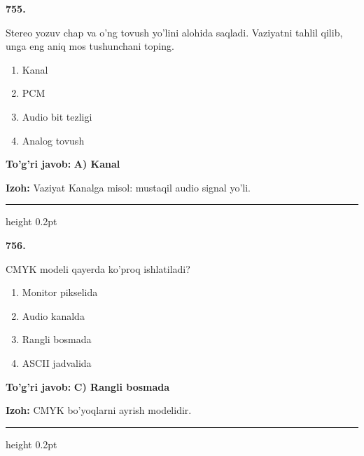 \documentclass[10pt,a4paper,oneside]{article}
\begin{document}
\noindent\textbf{\color{ink}755.}
\par
Stereo yozuv chap va o'ng tovush yo'lini alohida saqladi. Vaziyatni tahlil qilib, unga eng aniq mos tushunchani toping.
\begin{enumerate}[label=\Alph*),leftmargin=9mm]
\item Kanal
\item PCM
\item Audio bit tezligi
\item Analog tovush
\end{enumerate}
\begin{tcolorbox}[enhanced,breakable,colback=teal!4,colframe=teal!50!black,boxrule=0.5pt,arc=1.1mm,left=3mm,right=3mm,top=1.7mm,bottom=1.7mm,before skip=2mm,after skip=2mm]
\textbf{\color{teal}To'g'ri javob:} \textbf{A) Kanal}
\par\smallskip
\textbf{Izoh:} Vaziyat Kanalga misol: mustaqil audio signal yo'li.
\end{tcolorbox}
\vspace{2mm}\hrule height 0.2pt \vspace{3mm}

\noindent\textbf{\color{ink}756.}
\par
CMYK modeli qayerda ko'proq ishlatiladi?
\begin{enumerate}[label=\Alph*),leftmargin=9mm]
\item Monitor pikselida
\item Audio kanalda
\item Rangli bosmada
\item ASCII jadvalida
\end{enumerate}
\begin{tcolorbox}[enhanced,breakable,colback=teal!4,colframe=teal!50!black,boxrule=0.5pt,arc=1.1mm,left=3mm,right=3mm,top=1.7mm,bottom=1.7mm,before skip=2mm,after skip=2mm]
\textbf{\color{teal}To'g'ri javob:} \textbf{C) Rangli bosmada}
\par\smallskip
\textbf{Izoh:} CMYK bo'yoqlarni ayrish modelidir.
\end{tcolorbox}
\vspace{2mm}\hrule height 0.2pt \vspace{3mm}
\end{document}
